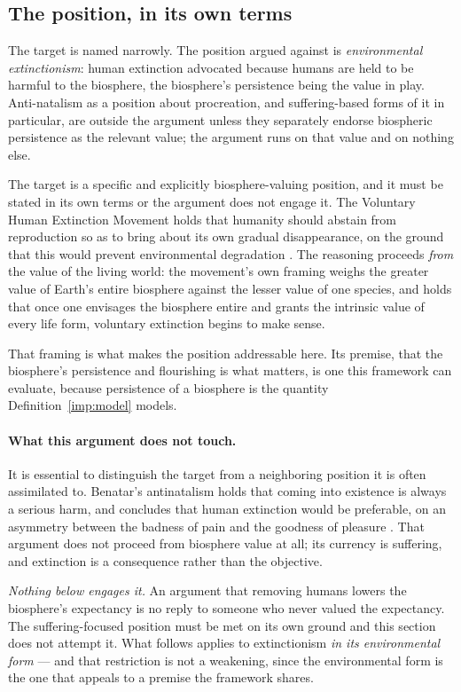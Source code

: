 \subsection{The position, in its own terms}

The target is named narrowly. The position argued against is
\emph{environmental extinctionism}: human extinction advocated because
humans are held to be harmful to the biosphere, the biosphere's
persistence being the value in play. Anti-natalism as a position about
procreation, and suffering-based forms of it in particular, are outside
the argument unless they separately endorse biospheric persistence as
the relevant value; the argument runs on that value and on nothing
else.\label{hr:subsub:position}

The target is a specific and explicitly biosphere-valuing position, and
it must be stated in its own terms or the argument does not engage it.
The Voluntary Human Extinction Movement holds that humanity should
abstain from reproduction so as to bring about its own gradual
disappearance, on the ground that this would prevent environmental
degradation \cite{VHEMT}. The reasoning proceeds \emph{from} the value
of the living world: the movement's own framing weighs the greater value
of Earth's entire biosphere against the lesser value of one species, and
holds that once one envisages the biosphere entire and grants the
intrinsic value of every life form, voluntary extinction begins to make
sense.

That framing is what makes the position addressable here. Its premise, that the biosphere's persistence and flourishing is what matters, is one this framework can evaluate, because persistence of a biosphere
is the quantity Definition~\ref{imp:model} models.

\paragraph{What this argument does not touch.}\label{hr:rem:scope}
It is essential to distinguish the target from a neighboring position
it is often assimilated to. Benatar's antinatalism holds that coming
into existence is always a serious harm, and concludes that human
extinction would be preferable, on an asymmetry between the badness of
pain and the goodness of pleasure \cite{Benatar06}. That argument does
not proceed from biosphere value at all; its currency is suffering, and
extinction is a consequence rather than the objective.

\emph{Nothing below engages it.} An argument that removing humans lowers
the biosphere's expectancy is no reply to someone who never valued the
expectancy. The suffering-focused position must be met on its own ground
and this section does not attempt it. What follows applies to
extinctionism \emph{in its environmental form} --- and that restriction
is not a weakening, since the environmental form is the one that appeals
to a premise the framework shares.

